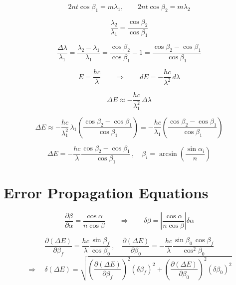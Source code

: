 \documentclass[11pt]{article}
\begin{document}
\[
2nt\cos\beta_1 = m\lambda_1,
\qquad
2nt\cos\beta_2 = m\lambda_2
\]

\[
\frac{\lambda_2}{\lambda_1}=\frac{\cos\beta_2}{\cos\beta_1}
\]

\[
\frac{\Delta\lambda}{\lambda_1}
=\frac{\lambda_2-\lambda_1}{\lambda_1}
=\frac{\cos\beta_2}{\cos\beta_1}-1
=\frac{\cos\beta_2-\cos\beta_1}{\cos\beta_1}
\]

\[
E=\frac{hc}{\lambda}
\qquad\Rightarrow\qquad
dE=-\frac{hc}{\lambda^2}\,d\lambda
\]

\[
\Delta E \approx -\frac{hc}{\lambda_1^2}\,\Delta\lambda
\]

\[
\Delta E
\approx
-\frac{hc}{\lambda_1^2}\,\lambda_1
\left(\frac{\cos\beta_2-\cos\beta_1}{\cos\beta_1}\right)
=
-\frac{hc}{\lambda_1}
\left(\frac{\cos\beta_2-\cos\beta_1}{\cos\beta_1}\right)
\]

\[
\boxed{
\Delta E
=
-\frac{hc}{\lambda}
\frac{\cos\beta_2-\cos\beta_1}{\cos\beta_1}
\,,\quad
\beta_i=\arcsin\!\left(\frac{\sin\alpha_i}{n}\right)
}
\]

\section{Error Propagation Equations}

\[
\frac{\partial \beta}{\partial \alpha} = \frac{\cos\alpha}{n\cos\beta}
\qquad\Rightarrow\qquad
\boxed{\delta\beta = \left|\frac{\cos\alpha}{n\cos\beta}\right| \delta\alpha}
\]

\[
\frac{\partial(\Delta E)}{\partial \beta_f}
= \frac{hc}{\lambda}\frac{\sin\beta_f}{\cos\beta_0}
\,,\quad
\frac{\partial(\Delta E)}{\partial \beta_0}
= -\frac{hc}{\lambda}\frac{\sin\beta_0\,\cos\beta_f}{\cos^2\beta_0}
\]
\[
\Rightarrow\quad
\boxed{
\delta(\Delta E)
= \sqrt{
  \left(\frac{\partial(\Delta E)}{\partial \beta_f}\right)^{\!2}
  (\delta\beta_f)^2
  +
  \left(\frac{\partial(\Delta E)}{\partial \beta_0}\right)^{\!2}
  (\delta\beta_0)^2
}
}
\]
\end{document}
